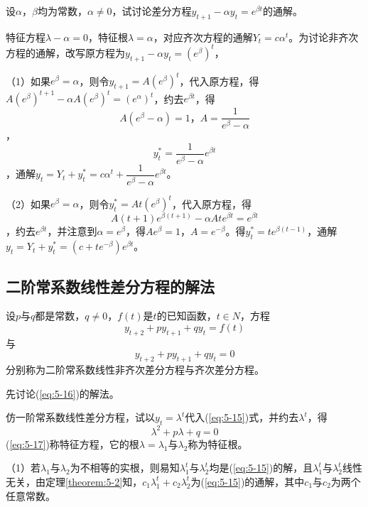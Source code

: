 		\example 设$\alpha$，$\beta$均为常数，$\alpha \neq 0$，试讨论差分方程$y_{t+1} - \alpha y_t = e^{\beta t}$的通解。

		\answer 特征方程$\lambda - \alpha = 0$，特征根$\lambda = \alpha$，对应齐次方程的通解$Y_t = c \alpha ^t$。为讨论非齐次方程的通解，改写原方程为$y_{t+1} - \alpha y_t = (e^{\beta})^t$，

		（1）如果$e^{\beta} = \alpha$，则令$y_{t+1} = A(e^{\beta})^t$，代入原方程，得$A(e^{\beta})^{t+1} - \alpha A(e^{\beta})^t = (e^{\alpha}) ^ t$，约去$e^{\beta t}$，得$$A(e^{\beta} - \alpha) = 1 \text{，} A = \dfrac{1}{e^{\beta} - \alpha}$$，$$y^*_t = \dfrac{1}{e^{\beta} - \alpha}e^{\beta t}$$，通解$y_t = Y_t + y^*_t = c {\alpha}^t + \dfrac{1}{e ^ {\beta} - \alpha} e^{\beta t}$。

		（2）如果$e^{\beta} = \alpha$，则令$y^*_t = At(e^{\beta})^t$，代入原方程，得$$A(t+1)e^{\beta (t+1)} - \alpha Ate^{\beta t} = e^{\beta t}$$，约去$e^{\beta t}$，并注意到$\alpha = e^{\beta}$，得$Ae^{\beta} = 1$，$A = e^{-\beta}$。得$y^*_t = t e^{\beta (t-1)}$，通解$y_t = Y_t + y^*_t = (c + te^{-\beta})e^{\beta t}$。

		\subsection{二阶常系数线性差分方程的解法}

		 设$p$与$q$都是常数，$q \neq 0$，$f(t)$是$t$的已知函数，$t \in N$，方程
		\begin{equation}\label{eq:5-15}
			y_{t+2} + py_{t+1} + qy_t = f(t)
		\end{equation}
		与
		\begin{equation}\label{eq:5-16}
			y_{t+2} + py_{t+1} + qy_t = 0
		\end{equation}
		分别称为{\heiti 二阶常系数线性非齐次差分方程}与{\heiti 齐次差分方程}。

		先讨论(\ref{eq:5-16})的解法。

		仿一阶常系数线性差分方程，试以$y_t = \lambda ^t$代入(\ref{eq:5-15})式，并约去$\lambda ^t$，得
		\begin{equation}\label{eq:5-17}
			\lambda ^2 + p\lambda + q = 0
		\end{equation}
		(\ref{eq:5-17})称{\heiti 特征方程}，它的根$\lambda = \lambda _1$与$\lambda _2$称为{\heiti 特征根}。

		（1）若$\lambda _1$与$\lambda _2$为不相等的实根，则易知$\lambda ^t_1$与$\lambda ^t_2$均是(\ref{eq:5-15})的解，且$\lambda ^t_1$与$\lambda ^t_2$线性无关，由定理\ref{theorem:5-2}知，$c_1 \lambda ^t_1 + c_2 \lambda ^t_2$为(\ref{eq:5-15})的通解，其中$c_1$与$c_2$为两个任意常数。

